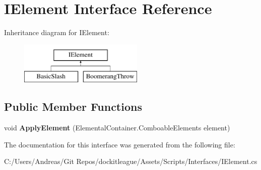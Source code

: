 \hypertarget{interface_i_element}{}\section{I\+Element Interface Reference}
\label{interface_i_element}
Inheritance diagram for I\+Element\+:\begin{figure}[H]
\begin{center}
\leavevmode
\includegraphics[height=2.000000cm]{interface_i_element}
\end{center}
\end{figure}
\subsection*{Public Member Functions}
\begin{DoxyCompactItemize}
\item 
\hypertarget{interface_i_element_a023e4b181020e24fda55903400aec4aa}{}\label{interface_i_element_a023e4b181020e24fda55903400aec4aa} 
void {\bfseries Apply\+Element} (Elemental\+Container.\+Comboable\+Elements element)
\end{DoxyCompactItemize}


The documentation for this interface was generated from the following file\+:\begin{DoxyCompactItemize}
\item 
C\+:/\+Users/\+Andreas/\+Git Repos/dockitleague/\+Assets/\+Scripts/\+Interfaces/I\+Element.\+cs\end{DoxyCompactItemize}
